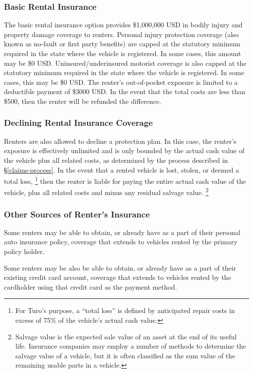 \documentclass[review,12pt]{elsarticle}
\begin{document}
\subsubsection{Basic Rental Insurance}\label{basic-rental-insurance}
The basic rental insurance option provides \$1,000,000 USD in bodily injury and property damage coverage to renters. Personal injury protection coverage (also known as no-fault or first party benefits) are capped at the statutory minimum required in the state where the vehicle is registered. In some cases, this amount may be \$0 USD. Uninsured/underinsured motorist coverage is also capped at the statutory minimum required in the state where the vehicle is registered. In some cases, this may be \$0 USD. The renter's out-of-pocket exposure is limited to a deductible payment of \$3000 USD. In the event that the total costs are less than \$500, then the renter will be refunded the difference.

\subsubsection{Declining Rental Insurance Coverage}\label{commercial-insurance}
Renters are also allowed to decline a protection plan. In this case, the renter's exposure is effectively unlimited and is only bounded by the actual cash value of the vehicle plus all related costs, as determined by the process described in \S\ref{claims-process}. In the event that a rented vehicle is lost, stolen, or deemed a total loss,
\footnote{For Turo's purpose, a ``total loss'' is defined by anticipated repair costs in excess of 75\% of the vehicle's actual cash value.
}
then the renter is liable for paying the entire actual cash value of the vehicle, plus all related costs and minus any residual salvage value.
\footnote{Salvage value is the expected sale value of an asset at the end of its useful life. Insurance companies may employ a number of methods to determine the salvage value of a vehicle, but it is often classified as the sum value of the remaining usable parts in a vehicle.
}

\subsubsection{Other Sources of Renter's Insurance}
Some renters may be able to obtain, or already have as a part of their personal auto insurance policy, coverage that extends to vehicles rented by the primary policy holder.

Some renters may be also be able to obtain, or already have as a part of their existing credit card account, coverage that extends to vehicles rented by the cardholder using that credit card as the payment method.
\end{document}
